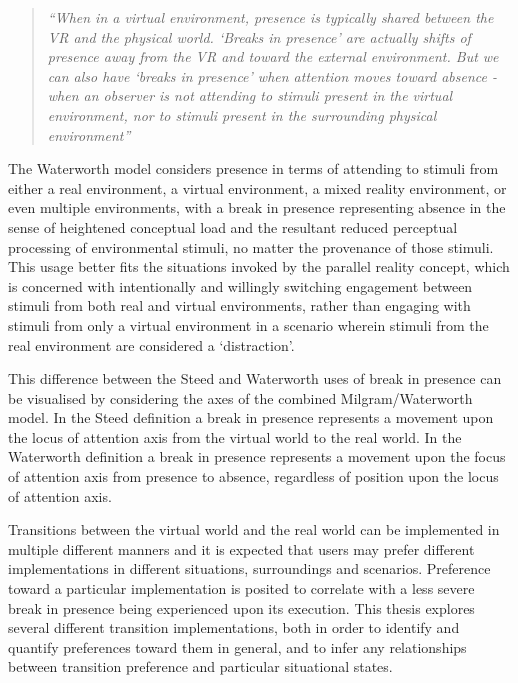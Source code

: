 \begin{quote}
	\textit{``When in a virtual environment, presence is typically shared between the VR and the physical world. `Breaks in presence' are actually shifts of presence away from the VR and toward the external environment. But we can also have `breaks in presence' when attention moves toward absence - when an observer is not attending to stimuli present in the virtual environment, nor to stimuli present in the surrounding physical environment''}~\cite{Waterworth2001}
\end{quote}

The Waterworth model considers presence in terms of attending to stimuli from either a real environment, a virtual environment, a mixed reality environment, or even multiple environments, with a break in presence representing absence in the sense of heightened conceptual load and the resultant reduced perceptual processing of environmental stimuli, no matter the provenance of those stimuli. This usage better fits the situations invoked by the parallel reality concept, which is concerned with intentionally and willingly switching engagement between stimuli from both real and virtual environments, rather than engaging with stimuli from only a virtual environment in a scenario wherein stimuli from the real environment are considered a `distraction'.

This difference between the Steed and Waterworth uses of break in presence can be visualised by considering the axes of the combined Milgram/Waterworth model. In the Steed definition a break in presence represents a movement upon the locus of attention axis from the virtual world to the real world. In the Waterworth definition a break in presence represents a movement upon the focus of attention axis from presence to absence, regardless of position upon the locus of attention axis.

Transitions between the virtual world and the real world can be implemented in multiple different manners and it is expected that users may prefer different implementations in different situations, surroundings and scenarios. Preference toward a particular implementation is posited to correlate with a less severe break in presence being experienced upon its execution. This thesis explores several different transition implementations, both in order to identify and quantify preferences toward them in general, and to infer any relationships between transition preference and particular situational states.



